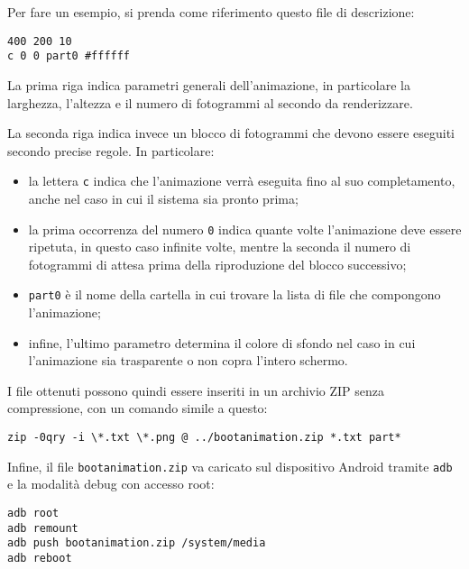 Per fare un esempio, si prenda come riferimento questo file di descrizione:

\begin{verbatim}
400 200 10
c 0 0 part0 #ffffff
\end{verbatim}

La prima riga indica parametri generali dell'animazione, in particolare la larghezza, l'altezza e il numero di fotogrammi al secondo da renderizzare.

La seconda riga indica invece un blocco di fotogrammi che devono essere eseguiti secondo precise regole. In particolare:

\begin{itemize}
	\item la lettera \texttt{c} indica che l'animazione verrà eseguita fino al suo completamento, anche nel caso in cui il sistema sia pronto prima;
	\item la prima occorrenza del numero \texttt{0} indica quante volte l'animazione deve essere ripetuta, in questo caso infinite volte, mentre la seconda il numero di fotogrammi di attesa prima della riproduzione del blocco successivo;
	\item \texttt{part0} è il nome della cartella in cui trovare la lista di file che compongono l'animazione;
	\item infine, l'ultimo parametro determina il colore di sfondo nel caso in cui l'animazione sia trasparente o non copra l'intero schermo.
\end{itemize}

I file ottenuti possono quindi essere inseriti in un archivio ZIP senza compressione, con un comando simile a questo:

\begin{verbatim}
zip -0qry -i \*.txt \*.png @ ../bootanimation.zip *.txt part*
\end{verbatim}

Infine, il file \texttt{bootanimation.zip} va caricato sul dispositivo Android tramite \texttt{adb} e la modalità debug con accesso root:

\begin{verbatim}
adb root
adb remount
adb push bootanimation.zip /system/media
adb reboot
\end{verbatim}

